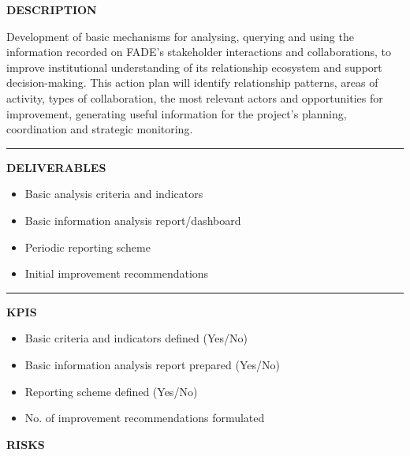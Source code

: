 \documentclass[11pt,a4paper]{scrreprt}
\newcommand{\fieldlabel}[1]{%
  {\footnotesize\sffamily\bfseries\color{mutedcolor}\MakeUppercase{#1}}\par\nopagebreak[4]
}
\newcommand{\fieldsep}{\vspace{3pt}\noindent\textcolor{bordercolor}{\rule{\linewidth}{0.4pt}}\vspace{3pt}\par}
\begin{document}
\begin{tcolorbox}[pabox={filcolor}{A.P.3.2 \enspace\textbullet\enspace Analysis and Use of Information to Improve FADE's Relational Management}]

\fieldlabel{Description}
{\small Development of basic mechanisms for analysing, querying and using the information recorded on FADE's stakeholder interactions and collaborations, to improve institutional understanding of its relationship ecosystem and support decision-making. This action plan will identify relationship patterns, areas of activity, types of collaboration, the most relevant actors and opportunities for improvement, generating useful information for the project's planning, coordination and strategic monitoring. }\par
\fieldsep
\fieldlabel{Deliverables}
{\small \begin{itemize}[noitemsep,topsep=2pt]
\item Basic analysis criteria and indicators
\item Basic information analysis report/dashboard
\item Periodic reporting scheme
\item Initial improvement recommendations
\end{itemize}}\par
\fieldsep
\fieldlabel{KPIs}
{\small \begin{itemize}[noitemsep,topsep=2pt]
\item Basic criteria and indicators defined (Yes/No)
\item Basic information analysis report prepared (Yes/No)
\item Reporting scheme defined (Yes/No)
\item No. of improvement recommendations formulated
\end{itemize}}\par
\end{tcolorbox}
\begin{tcolorbox}[riskbox]
{\footnotesize\sffamily\bfseries\color{red!50!black} RISKS}\par{}
\end{tcolorbox}
\end{document}
